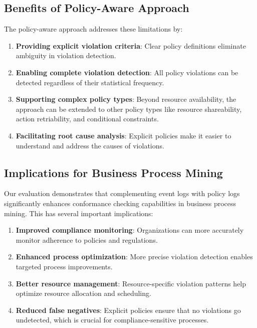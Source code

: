 \subsection{Benefits of Policy-Aware Approach}

The policy-aware approach addresses these limitations by:

\begin{enumerate}
    \item \textbf{Providing explicit violation criteria}: Clear policy definitions eliminate ambiguity in violation detection.
    
    \item \textbf{Enabling complete violation detection}: All policy violations can be detected regardless of their statistical frequency.
    
    \item \textbf{Supporting complex policy types}: Beyond resource availability, the approach can be extended to other policy types like resource shareability, action retriability, and conditional constraints.
    
    \item \textbf{Facilitating root cause analysis}: Explicit policies make it easier to understand and address the causes of violations.
\end{enumerate}

\subsection{Implications for Business Process Mining}

Our evaluation demonstrates that complementing event logs with policy logs significantly enhances conformance checking capabilities in business process mining. This has several important implications:

\begin{enumerate}
    \item \textbf{Improved compliance monitoring}: Organizations can more accurately monitor adherence to policies and regulations.
    
    \item \textbf{Enhanced process optimization}: More precise violation detection enables targeted process improvements.
    
    \item \textbf{Better resource management}: Resource-specific violation patterns help optimize resource allocation and scheduling.
    
    \item \textbf{Reduced false negatives}: Explicit policies ensure that no violations go undetected, which is crucial for compliance-sensitive processes.
\end{enumerate}

